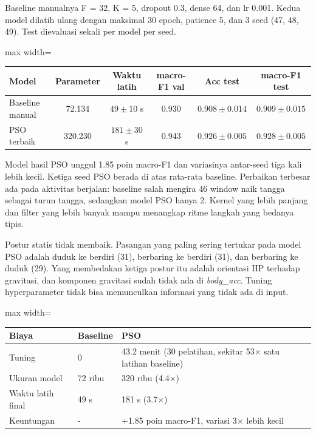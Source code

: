 Baseline manualnya F = 32, K = 5, dropout 0.3, dense 64, dan lr 0.001. Kedua model dilatih ulang dengan maksimal 30 epoch, patience 5, dan 3 seed (47, 48, 49). Test dievaluasi sekali per model per seed.

\begin{adjustbox}{max width=\textwidth}\begin{tabular}{@{}lccccc@{}}
\toprule
\textbf{Model} & \textbf{Parameter} & \textbf{Waktu latih} & \textbf{macro-F1 val} & \textbf{Acc test} & \textbf{macro-F1 test} \\
\midrule
Baseline manual & 72.134 & $49 \pm 10$ s & 0.930 & $0.908 \pm 0.014$ & $0.909 \pm 0.015$ \\
PSO terbaik & 320.230 & $181 \pm 30$ s & 0.943 & $0.926 \pm 0.005$ & $0.928 \pm 0.005$ \\
\bottomrule
\end{tabular}\end{adjustbox}


Model hasil PSO unggul 1.85 poin macro-F1 dan variasinya antar-seed tiga kali lebih kecil. Ketiga seed PSO berada di atas rata-rata baseline. Perbaikan terbesar ada pada aktivitas berjalan: baseline salah mengira 46 window naik tangga sebagai turun tangga, sedangkan model PSO hanya 2. Kernel yang lebih panjang dan filter yang lebih banyak mampu menangkap ritme langkah yang bedanya tipis.

Postur statis tidak membaik. Pasangan yang paling sering tertukar pada model PSO adalah duduk ke berdiri (31), berbaring ke berdiri (31), dan berbaring ke duduk (29). Yang membedakan ketiga postur itu adalah orientasi HP terhadap gravitasi, dan komponen gravitasi sudah tidak ada di \emph{body\_acc}. Tuning hyperparameter tidak bisa memunculkan informasi yang tidak ada di input.

\begin{adjustbox}{max width=\textwidth}\begin{tabular}{@{}lll@{}}
\toprule
\textbf{Biaya} & \textbf{Baseline} & \textbf{PSO} \\
\midrule
Tuning & 0 & 43.2 menit (30 pelatihan, sekitar 53$\times$ satu latihan baseline) \\
Ukuran model & 72 ribu & 320 ribu (4.4$\times$) \\
Waktu latih final & 49 s & 181 s (3.7$\times$) \\
Keuntungan & - & +1.85 poin macro-F1, variasi 3$\times$ lebih kecil \\
\bottomrule
\end{tabular}\end{adjustbox}

